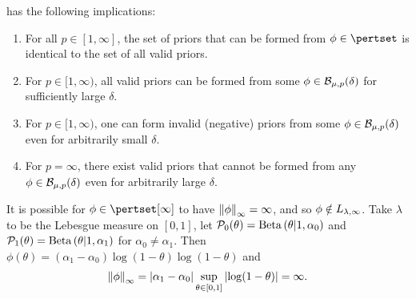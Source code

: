 \begin{lem}
 has the following implications:

\begin{enumerate}
%
\item For all $p \in [1, \infty]$, the set of priors that can be formed from
$\phi \in \pertset$ is identical to the set of all valid priors.
%
\item For $p \in [1, \infty)$, all valid priors can be formed from
some $\phi \in \mathcal{B}_{\mu,p}(\delta)$ for sufficiently large $\delta$.
%
\item For $p \in [1, \infty)$, one can form invalid (negative) priors from
some $\phi \in \mathcal{B}_{\mu,p}(\delta)$ even for arbitrarily small $\delta$.
%
\item For $p = \infty$, there exist valid priors that cannot be formed
from any $\phi \in \mathcal{B}_{\mu,p}(\delta)$ even for arbitrarily large $\delta$.
%
\end{enumerate}

%
\end{lem}


\begin{ex}
%
It is possible for $\phi \in \pertset[\infty]$ to have $\left\Vert\phi\right\Vert_{\infty} =
\infty$, and so $\phi \notin {L_{\lambda,\infty}}$.  Take $\lambda$ to be the
Lebesgue measure on $[0,1]$, let $\mathcal{P}_{0}(\theta) = \mathrm{Beta}\left(\theta \vert 1,
\alpha_0\right)$ and $\mathcal{P}_{1}(\theta) = \mathrm{Beta}\left(\theta \vert 1, \alpha_1\right)$ for
$\alpha_0 \ne \alpha_1$.  Then $\phi(\theta) = (\alpha_1 - \alpha_0) \log(1 -
\theta) \log(1 - \theta)$
%
and
%
\begin{align*}
%
\norminf{\phi} =
    \abs{\alpha_1 - \alpha_0} \sup_{\theta \in [0,1]} \abs{\log(1 - \theta)} =
    \infty.
%
\end{align*}
%
\end{ex}


